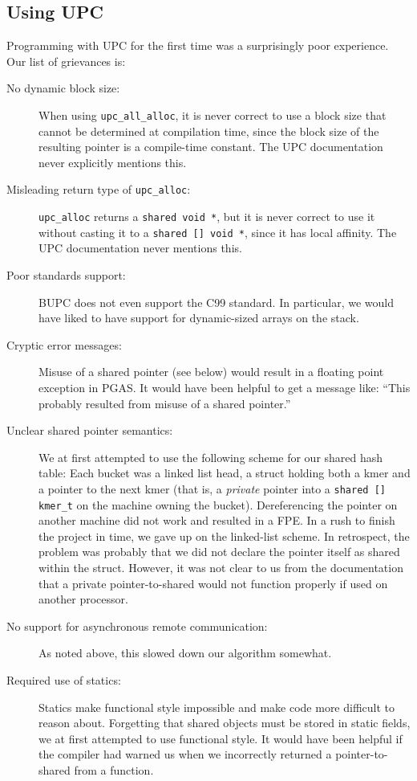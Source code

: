 \documentclass{article}
\begin{document}
\subsection{Using UPC}
Programming with UPC for the first time was a surprisingly poor experience.  Our list of grievances is:
\begin{description}
  \item[No dynamic block size:] When using \texttt{upc\_all\_alloc}, it is never correct to use a block size that cannot be determined at compilation time, since the block size of the resulting pointer is a compile-time constant.  The UPC documentation never explicitly mentions this.
  \item[Misleading return type of \texttt{upc\_alloc}:] \texttt{upc\_alloc} returns a \texttt{shared void *}, but it is never correct to use it without casting it to a \texttt{shared [] void *}, since it has local affinity.  The UPC documentation never mentions this.
  \item[Poor standards support:] BUPC does not even support the C99 standard.  In particular, we would have liked to have support for dynamic-sized arrays on the stack.
  \item[Cryptic error messages:] Misuse of a shared pointer (see below) would result in a floating point exception in PGAS.  It would have been helpful to get a message like: ``This probably resulted from misuse of a shared pointer.''
  \item[Unclear shared pointer semantics:] We at first attempted to use the following scheme for our shared hash table: Each bucket was a linked list head, a struct holding both a kmer and a pointer to the next kmer (that is, a \emph{private} pointer into a \texttt{shared [] kmer\_t} on the machine owning the bucket).  Dereferencing the pointer on another machine did not work and resulted in a FPE.  In a rush to finish the project in time, we gave up on the linked-list scheme.  In retrospect, the problem was probably that we did not declare the pointer itself as shared within the struct.  However, it was not clear to us from the documentation that a private pointer-to-shared would not function properly if used on another processor.
  \item[No support for asynchronous remote communication:] As noted above, this slowed down our algorithm somewhat.
  \item[Required use of statics:] Statics make functional style impossible and make code more difficult to reason about.  Forgetting that shared objects must be stored in static fields, we at first attempted to use functional style.  It would have been helpful if the compiler had warned us when we incorrectly returned a pointer-to-shared from a function.
\end{description}
\end{document}
